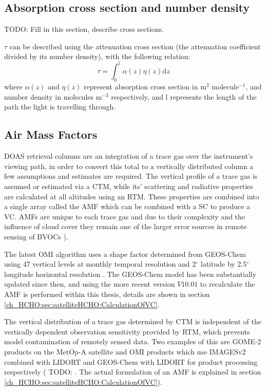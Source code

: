   \subsection{Absorption cross section and number density}
    \label{ch_HCHO:sec:satelliteHCHO:crosssection}
    TODO: Fill in this section, describe cross sections.
    
    
    $\tau$ can be described using the attenuation cross section (the attenuation coefficient divided by its number density), with the following relation:
    \begin{equation*}
      \tau = \int_0^l \alpha(z)\eta(z)\mathrm{d}z
    \end{equation*}
    where $\alpha(z)$ and $\eta(z)$ represent absorption cross section in m$^2$ molecule$^{-1}$, and number density in molecules m$^{-3}$ respectively, and l represents the length of the path the light is travelling through. 
  
  
  \subsection{Air Mass Factors}
    \label{ch_HCHO:sec:satelliteHCHO:AMFs}
    DOAS retrieval columns are an integration of a trace gas over the instrument's viewing path, in order to convert this total to a vertically distributed column a few assumptions and estimates are required. 
    The vertical profile of a trace gas is assumed or estimated via a CTM, while its' scattering and radiative properties are calculated at all altitudes using an RTM. 
    These properties are combined into a single array called the AMF which can be combined with a SC to produce a VC.
    AMFs are unique to each trace gas and due to their complexity and the influence of cloud cover they remain one of the larger error sources in remote sensing of BVOCs \citep{Palmer2001,Millet2006}).
    
    The latest OMI algorithm uses a shape factor determined from GEOS-Chem using 47 vertical levels at monthly temporal resolution and 2$^{\circ}$ latitude by 2.5$^{\circ}$ longitude horizontal resolution \citep{Abad2015}.
    The GEOS-Chem model has been substantially updated since then, and using the more recent version $V10.01$ to recalculate the AMF is performed within this thesis, details are shown in section \ref{ch_HCHO:sec:satelliteHCHO:CalculationOfVC}.
    
    The vertical distribution of a trace gas determined by CTM is independent of the vertically dependent observation sensitivity provided by RTM, which prevents model contamination of remotely sensed data.
    Two examples of this are GOME-2 products on the MetOp-A satellite and OMI products which use IMAGESv2 combined with LIDORT and GEOS-Chem with LIDORT for product processing respectively ( TODO: %
    \citep{Abad2015}.
    The actual formulation of an AMF is explained in section \ref{ch_HCHO:sec:satelliteHCHO:CalculationOfVC}).
    
